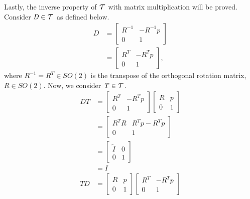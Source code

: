 \documentclass[11pt]{article}
\newcommand\Tau{\scalerel*{\tau}{T}}
\begin{document}
\begin{enumerate}[leftmargin=0.3in]
\begin{enumerate}
   Lastly, the inverse property of $\Tau$ with matrix multiplication will be proved. Consider $\mathit{D} \in \Tau$ as defined below.
   \begin{align*}
       \mathit{D} &= \begin{bmatrix}
           \mathit{R}^{-1} & -\mathit{R}^{-1} p \\
          0 & 1
       \end{bmatrix} \\
       &= \begin{bmatrix}
           \mathit{R}^T & -\mathit{R}^T p \\
          0 & 1
       \end{bmatrix} ,
   \end{align*}
   where $\mathit{R}^{-1} = \mathit{R}^T \in \mathit{SO}(2)$ is the transpose of the orthogonal rotation matrix, $\mathit{R} \in \mathit{SO}(2)$. Now, we consider $\mathit{T} \in \Tau$.
   \begin{align*}
       \mathit{D} \mathit{T} &= \begin{bmatrix}
           \mathit{R}^T & -\mathit{R}^T p \\
           0 & 1
           \end{bmatrix} \begin{bmatrix}
           R & p \\
           0 & 1
       \end{bmatrix} \\
       &= \begin{bmatrix} 
           \mathit{R}^T \mathit{R} & \mathit{R}^T \mathit{p} - \mathit{R}^T \mathit{p} \\
           0 & 1
       \end{bmatrix} \\
       &= \begin{bmatrix}
           \tilde{\mathit{I}} & \mathit{0} \\
           0 & 1
       \end{bmatrix} \\
       &= \mathit{I} \\
           \mathit{T} \mathit{D} &= \begin{bmatrix} 
           R & p \\
           0 & 1 
           \end{bmatrix} \begin{bmatrix}
           \mathit{R}^T & -\mathit{R}^T p \\
           0 & 1
           \end{bmatrix} \\

\end{align*}
\end{enumerate}
\end{enumerate}
\end{document}
